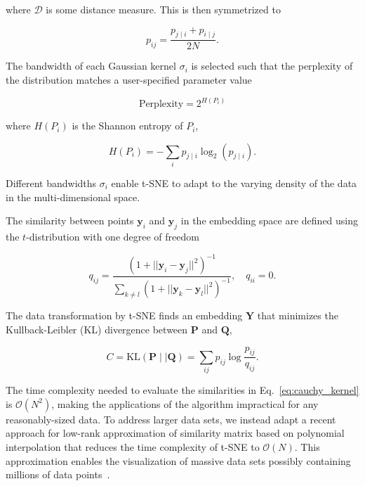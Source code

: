 \documentclass[runningheads]{llncs}
\begin{document}
\noindent where $\mathcal{D}$ is some distance measure. This is then symmetrized to

\begin{equation}
p_{ij} = \frac{p_{j \mid i} + p_{i \mid j}}{2N}.
\label{eq:symmetrize}
\end{equation}

The bandwidth of each Gaussian kernel $\sigma_i$ is selected such that the
perplexity of the distribution matches a user-specified parameter value

\begin{equation}
\text{Perplexity} = 2^{H(P_i)}
\end{equation}

\noindent where $H(P_i)$ is the Shannon entropy of $P_i$,

\begin{equation}
H(P_i) = -\sum_i p_{j \mid i} \log_2 (p_{j \mid i}).
\end{equation}

\noindent Different bandwidths $\sigma_i$ enable t-SNE to adapt to the varying
density of the data in the multi-dimensional space.

The similarity between points $\mathbf{y}_i$ and $\mathbf{y}_j$ in the
embedding space are defined using the $t$-distribution with one degree of
freedom

\begin{equation}
q_{ij} = \frac{\left ( 1 + || \mathbf{y}_i - \mathbf{y}_j ||^2 \right )^{-1}}
{\sum_{k \neq l}\left ( 1 + || \mathbf{y}_k - \mathbf{y}_l ||^2 \right )^{-1}},
\quad q_{ii} = 0.
\label{eq:cauchy_kernel}
\end{equation}

The data transformation by t-SNE finds an embedding $\mathbf{Y}$ that minimizes
the Kullback-Leibler (KL) divergence between $\mathbf{P}$ and $\mathbf{Q}$,

\begin{equation}
C = \text{KL}(\mathbf{P} \mid \mid \mathbf{Q}) = \sum_{ij} p_{ij} \log \frac{p_{ij}}{q_{ij}}.
\label{eq:kl_divergence}
\end{equation}

The time complexity needed to evaluate the similarities in
Eq.~\ref{eq:cauchy_kernel} is $\mathcal{O}(N^2)$, making the applications of
the algorithm impractical for any reasonably-sized data. To address larger data
sets, we instead adapt a recent approach for low-rank approximation of
similarity matrix based on polynomial interpolation that reduces the time
complexity of t-SNE to $\mathcal{O}(N)$. This approximation enables the
visualization of massive data sets possibly containing millions of data
points~\cite{fi_tsne}.
\end{document}
